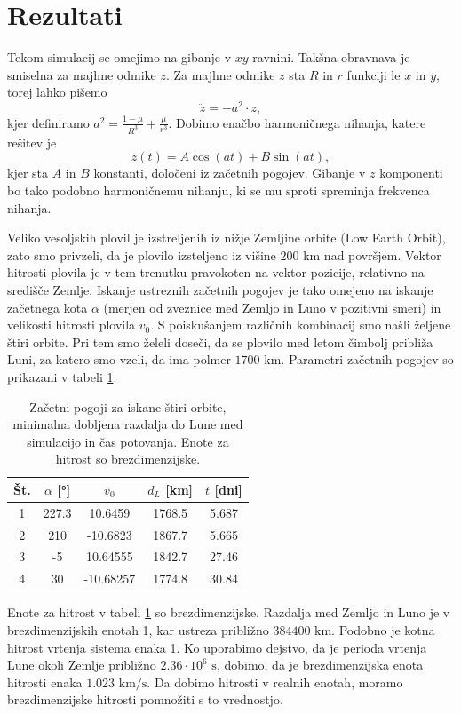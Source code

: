 \documentclass[11pt, titlepage]{article}
\begin{document}
\section{Rezultati}
Tekom simulacij se omejimo na gibanje v $xy$ ravnini. Takšna obravnava je smiselna za majhne odmike $z$.
Za majhne odmike $z$ sta $R$ in $r$ funkciji le $x$ in $y$, torej lahko pišemo
$$
\ddot{z} = - a^2 \cdot z,
$$
kjer definiramo $a^2 = \frac{1 - \mu}{R^3} + \frac{\mu}{r^3}$. Dobimo enačbo harmoničnega nihanja, katere rešitev je
$$
z(t) = A \cos(at) + B \sin(at),
$$
kjer sta $A$ in $B$ konstanti, določeni iz začetnih pogojev. Gibanje v $z$ komponenti bo tako podobno harmoničnemu nihanju, ki se mu sproti spreminja frekvenca nihanja. 

Veliko vesoljskih plovil je izstreljenih iz nižje Zemljine orbite (Low Earth Orbit), zato smo privzeli, da je plovilo izsteljeno iz višine $200 \text{ km}$ nad površjem. Vektor hitrosti plovila je v tem trenutku pravokoten na vektor pozicije, relativno na središče Zemlje. Iskanje ustreznih začetnih pogojev
je tako omejeno na iskanje začetnega kota $\alpha$ (merjen od zveznice med Zemljo in Luno v pozitivni smeri) in velikosti hitrosti plovila $v_0$. S poiskušanjem različnih kombinacij smo našli željene štiri orbite. Pri tem smo želeli doseči, da se plovilo med letom čimbolj približa Luni, za katero smo vzeli, da ima polmer $1700 \text{ km}$. Parametri začetnih pogojev
so prikazani v tabeli \ref{tab:initial_conditions}.
\begin{table}[h]
    \centering
    \begin{tabular}{|c|c|c|c|c|}
        \hline
        \textbf{Št.} & $\alpha$ [°] & $v_0$ & $d_L$ [km] & $t$ [dni] \\
        \hline
        1 & 227.3 & 10.6459 & 1768.5 & 5.687\\
        2 & 210 & -10.6823 & 1867.7 & 5.665\\
        3 & -5 & 10.64555 & 1842.7 & 27.46\\
        4 & 30 & -10.68257 & 1774.8 & 30.84\\
        \hline
    \end{tabular}
    \caption{Začetni pogoji za iskane štiri orbite, minimalna dobljena razdalja do Lune med simulacijo in čas potovanja. Enote za hitrost so brezdimenzijske.}
    \label{tab:initial_conditions}
\end{table}
Enote za hitrost v tabeli \ref{tab:initial_conditions} so brezdimenzijske. Razdalja med Zemljo in Luno je v brezdimenzijskih enotah 1, kar ustreza približno $384400 \text{ km}$. Podobno je kotna hitrost vrtenja sistema enaka 1. 
Ko uporabimo dejstvo, da je perioda vrtenja Lune okoli Zemlje približno $2.36 \cdot 10^6 \text{ s}$, dobimo, da je brezdimenzijska enota hitrosti enaka $1.023 \text{ km/s}$.
Da dobimo hitrosti v realnih enotah, moramo brezdimenzijske hitrosti pomnožiti s to vrednostjo.
\end{document}
